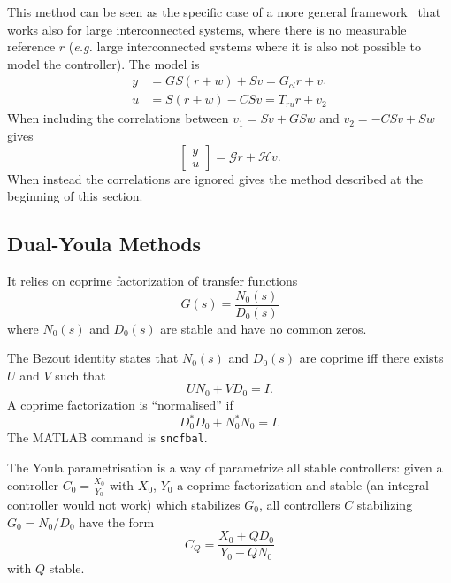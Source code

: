 This method can be seen as the specific case of a more general framework~\cite[Sect.~13.5]{ljung} that works also for large interconnected systems, where there is no measurable reference $r$ (\textit{e.g.} large interconnected systems where it is also not possible to model the controller). The model is
\begin{equation*}
  \begin{aligned}
    y &= GS(r+w) + Sv= G_{cl}r + v_1 \\
    u &= S(r+w) - CSv = T_{ru}r + v_2
  \end{aligned}
\end{equation*}
When including the correlations between $v_1 = Sv + GSw$ and $v_2 = -CSv + Sw$ gives
\begin{equation*}
  \begin{bmatrix}
    y \\ u
  \end{bmatrix} = \mathcal{G}r + \mathcal{H}v.
\end{equation*}
When instead the correlations are ignored gives the method described at the beginning of this section.

\subsection{Dual-Youla Methods}
\label{sec:dual-youla-methods}

It relies on coprime factorization of transfer functions
\begin{equation*}
  G(s) = \frac{N_0(s)}{D_0(s)}
\end{equation*}
where $N_0(s)$ and $D_0(s)$ are stable and have no common zeros.

The Bezout identity states that $N_0(s)$ and $D_0(s)$ are coprime iff there exists $U$ and $V$ such that
\begin{equation*}
  UN_0 + VD_0 = I.
\end{equation*}
A coprime factorization is ``normalised'' if
\begin{equation*}
  D_0^*D_0 + N_0^*N_0 = I.
\end{equation*}
The MATLAB command is \texttt{sncfbal}.

The Youla parametrisation is a way of parametrize all stable controllers: given a controller $C_0=\frac{X_0}{Y_0}$ with $X_0$, $Y_0$ a coprime factorization and stable (an integral controller would not work) which stabilizes $G_0$, all controllers $C$ stabilizing $G_0 = N_0/D_0$ have the form
\begin{equation*}
  C_Q = \frac{X_0+QD_0}{Y_0-QN_0}
\end{equation*}
with $Q$ stable.

